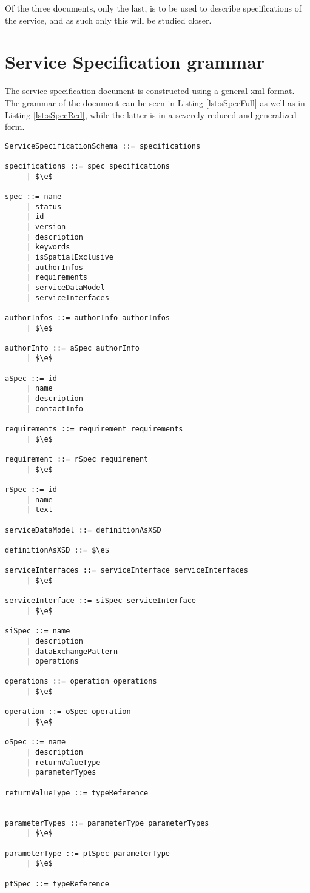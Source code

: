 Of the three documents, only the last,  is to be used to describe specifications of the service, and as such only this will be studied closer.
\section{Service Specification grammar}
The service specification document is constructed using a general xml-format. The grammar of the document can be seen in Listing \ref{lst:sSpecFull} as well as in Listing \ref{lst:sSpecRed}, while the latter is in a severely reduced and generalized form.
\begin{lstlisting}[keywordstyle={},label={lst:sSpecFull},caption={Full parser grammar of Service Specification Schema}]
ServiceSpecificationSchema ::= specifications

specifications ::= spec specifications
     | $\e$
     
spec ::= name
     | status
     | id
     | version
     | description
     | keywords
     | isSpatialExclusive
     | authorInfos
     | requirements
     | serviceDataModel
     | serviceInterfaces
     
authorInfos ::= authorInfo authorInfos
     | $\e$

authorInfo ::= aSpec authorInfo
     | $\e$

aSpec ::= id
     | name
     | description
     | contactInfo

requirements ::= requirement requirements
     | $\e$

requirement ::= rSpec requirement
     | $\e$

rSpec ::= id
     | name
     | text

serviceDataModel ::= definitionAsXSD

definitionAsXSD ::= $\e$

serviceInterfaces ::= serviceInterface serviceInterfaces
     | $\e$

serviceInterface ::= siSpec serviceInterface
     | $\e$

siSpec ::= name
     | description
     | dataExchangePattern
     | operations

operations ::= operation operations
     | $\e$

operation ::= oSpec operation
     | $\e$

oSpec ::= name
     | description
     | returnValueType
     | parameterTypes

returnValueType ::= typeReference


parameterTypes ::= parameterType parameterTypes
     | $\e$

parameterType ::= ptSpec parameterType
     | $\e$

ptSpec ::= typeReference
\end{lstlisting}


